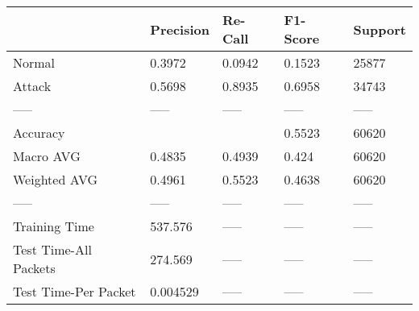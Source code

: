 \begin{tabular}{lllll}
\toprule
{} & Precision & Re-Call & F1-Score & Support \\
\midrule
Normal                &    0.3972 &  0.0942 &   0.1523 &   25877 \\
Attack                &    0.5698 &  0.8935 &   0.6958 &   34743 \\
-----                 &     ----- &   ----- &    ----- &   ----- \\
Accuracy              &           &         &   0.5523 &   60620 \\
Macro AVG             &    0.4835 &  0.4939 &    0.424 &   60620 \\
Weighted AVG          &    0.4961 &  0.5523 &   0.4638 &   60620 \\
-----                 &     ----- &   ----- &    ----- &   ----- \\
Training Time         &   537.576 &   ----- &    ----- &   ----- \\
Test Time-All Packets &   274.569 &   ----- &    ----- &   ----- \\
Test Time-Per Packet  &  0.004529 &   ----- &    ----- &   ----- \\
\bottomrule
\end{tabular}

